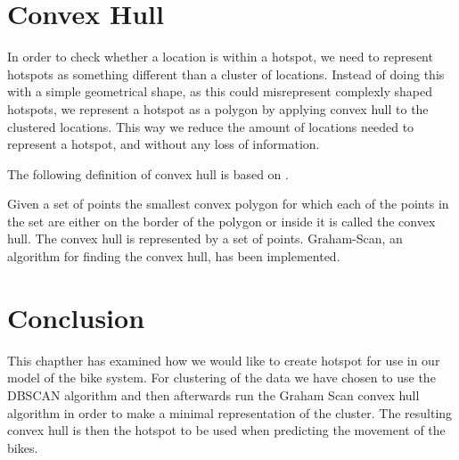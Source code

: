\section{Convex Hull}\label{convex_hull}
In order to check whether a location is within a hotspot, we need to represent hotspots as something different than a cluster of locations.
Instead of doing this with a simple geometrical shape, as this could misrepresent complexly shaped hotspots, we represent a hotspot as a polygon by applying convex hull to the clustered locations.
This way we reduce the amount of locations needed to represent a hotspot, and without any loss of information.

The following definition of convex hull is based on \citet[section 33.3]{aadbook}.

Given a set of points the smallest convex polygon for which each of the points in the set are either on the border of the polygon or inside it is called the convex hull. \cite[33.1-5]{aadbook}
The convex hull is represented by a set of points.
Graham-Scan\cite[page 1031]{aadbook}, an algorithm for finding the convex hull, has been implemented.


\section{Conclusion}

This chapther has examined how we would like to create hotspot for use in our model of the bike system.
For clustering of the data we have chosen to use the DBSCAN algorithm and then afterwards run the Graham Scan convex hull algorithm in order to make a minimal representation of the cluster.
The resulting convex hull is then the hotspot to be used when predicting the movement of the bikes.

